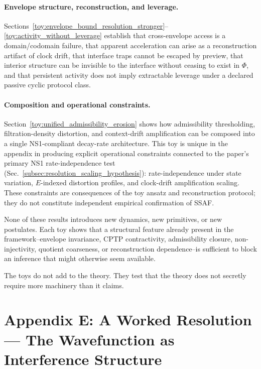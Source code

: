 \documentclass[aps,prx,onecolumn,11pt]{revtex4-2}
\theoremstyle{plain}
\theoremstyle{definition}
\theoremstyle{remark}
\begin{document}
\paragraph{Envelope structure, reconstruction, and leverage.}

Sections~\ref{toy:envelope_bound_resolution_stronger}--\ref{toy:activity_without_leverage}
establish that cross-envelope access is a domain/codomain failure, that
apparent acceleration can arise as a reconstruction artifact of clock
drift, that interface traps cannot be escaped by preview, that interior
structure can be invisible to the interface without ceasing to exist in
\(\Phi\), and that persistent activity does not imply extractable
leverage under a declared passive cyclic protocol class.

\paragraph{Composition and operational constraints.}

Section~\ref{toy:unified_admissibility_erosion} shows how
admissibility thresholding, filtration-density distortion, and
context-drift amplification can be composed into a single
NS1-compliant decay-rate architecture. This toy is unique in the
appendix in producing explicit operational constraints connected to
the paper's primary NS1 rate-independence test
(Sec.~\ref{subsec:resolution_scaling_hypothesis}): rate-independence
under state variation, \(E\)-indexed distortion profiles, and
clock-drift amplification scaling. These constraints are consequences
of the toy ansatz and reconstruction protocol; they do not constitute
independent empirical confirmation of SSAF.

None of these results introduces new dynamics, new primitives, or new
postulates. Each toy shows that a structural feature already present in
the framework--envelope invariance, CPTP contractivity, admissibility
closure, non-injectivity, quotient coarseness, or reconstruction
dependence--is sufficient to block an inference that might otherwise
seem available.

The toys do not add to the theory. They test that the theory does not
secretly require more machinery than it claims.

\section{Appendix E: A Worked Resolution --- The Wavefunction as Interference Structure}
\label{sec:appendixE_worked_resolution}
 
\end{document}
